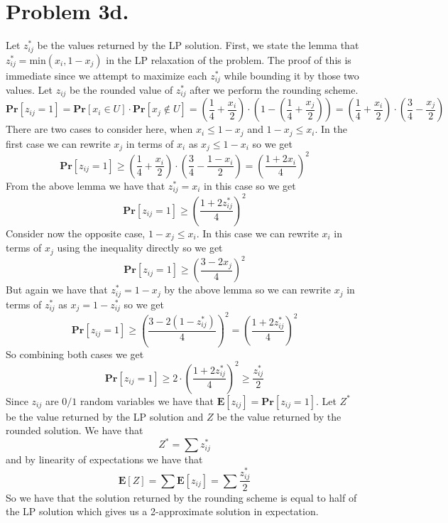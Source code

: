 \documentclass[12pt]{article}
\begin{document}
\section*{Problem 3d.}
Let $z_{ij}^*$ be the values returned by the LP solution.
First, we state the lemma that $z_{ij}^* = \text{min}(x_i, 1-x_j)$ in the
LP relaxation of the problem. The proof of this is immediate since we attempt
to maximize each $z_{ij}^*$ while bounding it by those two values.
Let $z_{ij}$ be the rounded value of $z_{ij}^*$ after we perform the rounding scheme.
$$\textbf{Pr}[z_{ij} = 1] =
\textbf{Pr}[x_i \in U]\cdot\textbf{Pr}[x_j \notin U] =
(\frac{1}{4} + \frac{x_i}{2}) \cdot (1-(\frac{1}{4} + \frac{x_j}{2})) =
(\frac{1}{4} + \frac{x_i}{2}) \cdot (\frac{3}{4} - \frac{x_j}{2})
$$
There are two cases to consider here, when $x_i \le 1-x_j$ and
$1-x_j \le x_i$. In the first case we can rewrite $x_j$ in terms of $x_i$ as
$x_j \le 1-x_i $ so we get
$$\textbf{Pr}[z_{ij} = 1] \ge 
(\frac{1}{4} + \frac{x_i}{2}) \cdot (\frac{3}{4} - \frac{1-x_i}{2}) =
\left(\frac{1+2x_i}{4}\right)^2
$$
From the above lemma we have that $z_{ij}^* = x_i$ in this case so we get
$$\textbf{Pr}[z_{ij} = 1] \ge \left(\frac{1+2z_{ij}^*}{4}\right)^2$$
Consider now the opposite case, $1-x_j \le x_i$. In this case we can rewrite
$x_i$ in terms of $x_j$ using the inequality directly so we get
$$\textbf{Pr}[z_{ij} = 1] \ge 
\left(\frac{3-2x_j}{4}\right)^2
$$
But again we have that $z_{ij}^* = 1 - x_j$ by the above lemma so we can rewrite
$x_j$ in terms of $z_{ij}^*$ as $x_j = 1 - z_{ij}^*$ so we get
$$\textbf{Pr}[z_{ij} = 1] \ge 
\left(\frac{3-2(1-z_{ij}^*)}{4}\right)^2 =
\left(\frac{1+2z_{ij}^*}{4}\right)^2
$$
So combining both cases we get
$$\textbf{Pr}[z_{ij} = 1] \ge 
2\cdot\left(\frac{1+2z_{ij}^*}{4}\right)^2 \ge
\frac{z_{ij}^*}{2}
$$
Since $z_{ij}$ are $0/1$ random variables we have that $\textbf{E}[z_{ij}] =
\textbf{Pr}[z_{ij} = 1]$. Let $Z^*$ be the value returned by the LP solution and
$Z$ be the value returned by the rounded solution. We have that
$$Z^* = \sum z_{ij}^*$$ and by linearity of expectations we have that
$$\textbf{E}[Z] = \sum \textbf{E}[z_{ij}] = \sum \frac{z_{ij}^*}{2}$$
So we have that the solution returned by the rounding scheme is equal to half of
the LP solution which gives us a 2-approximate solution in expectation.
\end{document}
